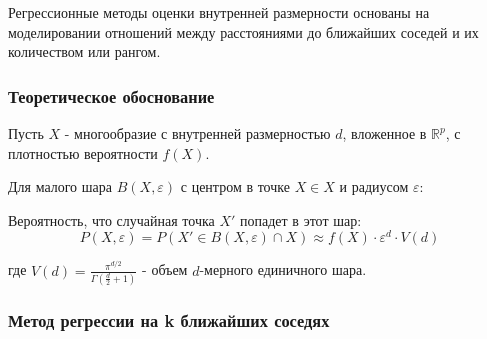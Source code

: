 \documentclass[a4paper,12pt]{article}
\begin{document}
Регрессионные методы оценки внутренней размерности основаны на моделировании отношений между расстояниями до ближайших соседей и их количеством или рангом.

\subsubsection{Теоретическое обоснование}

Пусть $X$ - многообразие с внутренней размерностью $d$, вложенное в $\mathbb{R}^p$, с плотностью вероятности $f(X)$.

Для малого шара $B(X, \varepsilon)$ с центром в точке $X \in X$ и радиусом $\varepsilon$:

Вероятность, что случайная точка $X'$ попадет в этот шар:
\begin{equation}
    P(X, \varepsilon) = P(X' \in B(X, \varepsilon) \cap X) \approx f(X) \cdot \varepsilon^d \cdot V(d)
\end{equation}

где $V(d) = \frac{\pi^{d/2}}{\Gamma(\frac{d}{2}+1)}$ - объем $d$-мерного единичного шара.

\subsubsection{Метод регрессии на k ближайших соседях}
\end{document}
